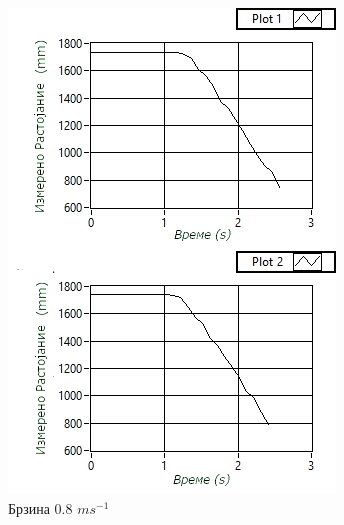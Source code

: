 \documentclass[11pt]{article}
\begin{document}
\begin{figure}[H]
\begin{minipage}{0.45\linewidth}
          \includegraphics[width = \textwidth]{./images/speed_composite_08_mk.png}
          \caption{Брзина 0.8 $ms^{-1}$}
        \end{minipage}
        \begin{minipage}{0.45\linewidth}
          \centering

\end{minipage}
\end{figure}
\end{document}
